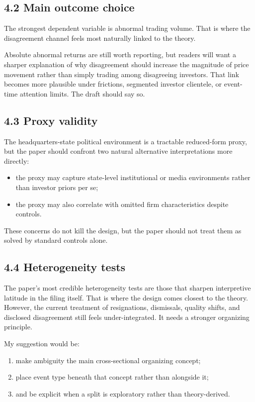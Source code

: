 \subsection*{4.2 Main outcome choice}

The strongest dependent variable is abnormal trading volume. That is where the disagreement channel feels most naturally linked to the theory.

Absolute abnormal returns are still worth reporting, but readers will want a sharper explanation of why disagreement should increase the magnitude of price movement rather than simply trading among disagreeing investors. That link becomes more plausible under frictions, segmented investor clientele, or event-time attention limits. The draft should say so.

\subsection*{4.3 Proxy validity}

The headquarters-state political environment is a tractable reduced-form proxy, but the paper should confront two natural alternative interpretations more directly:
\begin{itemize}[leftmargin=1.5em]
    \item the proxy may capture state-level institutional or media environments rather than investor priors per se;
    \item the proxy may also correlate with omitted firm characteristics despite controls.
\end{itemize}

These concerns do not kill the design, but the paper should not treat them as solved by standard controls alone.

\subsection*{4.4 Heterogeneity tests}

The paper's most credible heterogeneity tests are those that sharpen interpretive latitude in the filing itself. That is where the design comes closest to the theory. However, the current treatment of resignations, dismissals, quality shifts, and disclosed disagreement still feels under-integrated. It needs a stronger organizing principle.

My suggestion would be:
\begin{enumerate}[leftmargin=1.5em]
    \item make ambiguity the main cross-sectional organizing concept;
    \item place event type beneath that concept rather than alongside it;
    \item and be explicit when a split is exploratory rather than theory-derived.
\end{enumerate}

